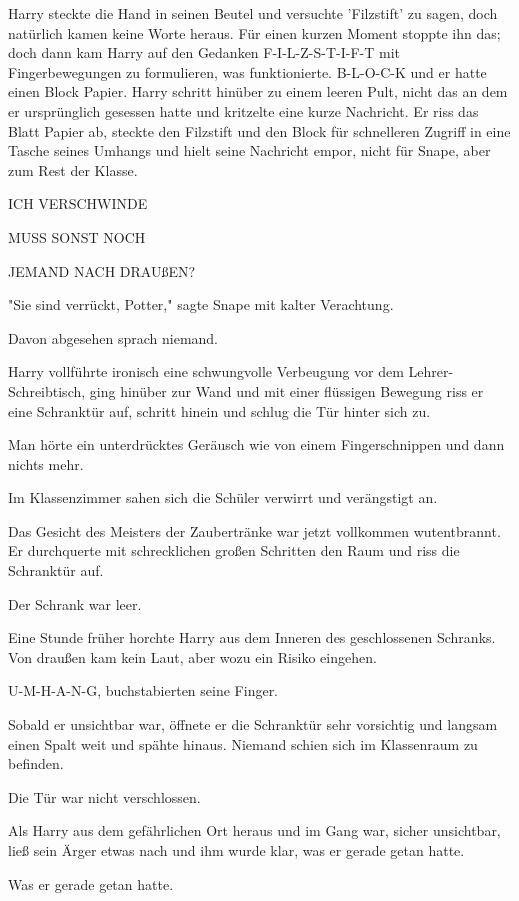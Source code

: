{Harry steckte die Hand in seinen Beutel und versuchte 'Filzstift' zu sagen, doch natürlich kamen keine Worte heraus. Für einen kurzen Moment stoppte ihn das; doch dann kam Harry auf den Gedanken F-I-L-Z-S-T-I-F-T mit Fingerbewegungen zu formulieren, was funktionierte. B-L-O-C-K und er hatte einen Block Papier. Harry schritt hinüber zu einem leeren Pult, nicht das an dem er ursprünglich gesessen hatte und kritzelte eine kurze Nachricht. Er riss das Blatt Papier ab, steckte den Filzstift und den Block für schnelleren Zugriff in eine Tasche seines Umhangs und hielt seine Nachricht empor, nicht für Snape, aber zum Rest der Klasse.

ICH VERSCHWINDE

MUSS SONST NOCH

JEMAND NACH DRAUßEN?

"Sie sind verrückt, Potter," sagte Snape mit kalter Verachtung.

Davon abgesehen sprach niemand.

Harry vollführte ironisch eine schwungvolle Verbeugung vor dem Lehrer-Schreibtisch, ging hinüber zur Wand und mit einer flüssigen Bewegung riss er eine Schranktür auf, schritt hinein und schlug die Tür hinter sich zu.

Man hörte ein unterdrücktes Geräusch wie von einem Fingerschnippen und dann nichts mehr.

Im Klassenzimmer sahen sich die Schüler verwirrt und verängstigt an.

Das Gesicht des Meisters der Zaubertränke war jetzt vollkommen wutentbrannt. Er durchquerte mit schrecklichen großen Schritten den Raum und riss die Schranktür auf.

Der Schrank war leer.

\later

Eine Stunde früher horchte Harry aus dem Inneren des geschlossenen Schranks. Von draußen kam kein Laut, aber wozu ein Risiko eingehen.

U-M-H-A-N-G, buchstabierten seine Finger.

Sobald er unsichtbar war, öffnete er die Schranktür sehr vorsichtig und langsam einen Spalt weit und spähte hinaus. Niemand schien sich im Klassenraum zu befinden.

Die Tür war nicht verschlossen.

Als Harry aus dem gefährlichen Ort heraus und im Gang war, sicher unsichtbar, ließ sein Ärger etwas nach und ihm wurde klar, was er gerade getan hatte.

Was er gerade getan hatte.

}
